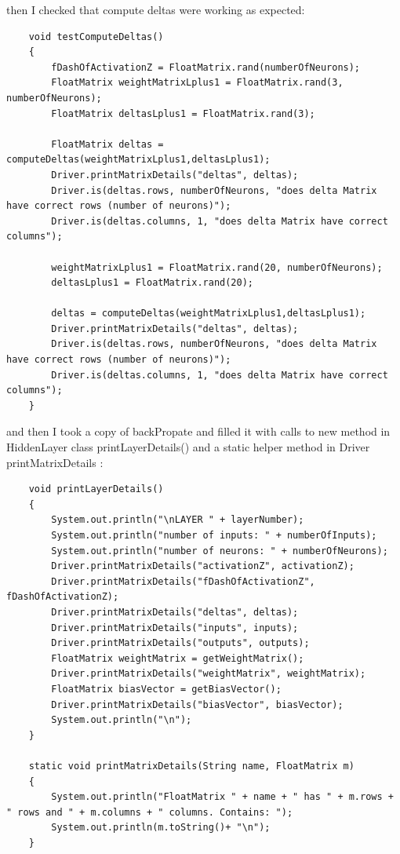 \documentclass[11pt]{article} %
\begin{document}
then I checked that compute deltas were working as expected:
\begin{lstlisting}
    void testComputeDeltas()
    {
        fDashOfActivationZ = FloatMatrix.rand(numberOfNeurons);
        FloatMatrix weightMatrixLplus1 = FloatMatrix.rand(3, numberOfNeurons);
        FloatMatrix deltasLplus1 = FloatMatrix.rand(3);

        FloatMatrix deltas = computeDeltas(weightMatrixLplus1,deltasLplus1);
        Driver.printMatrixDetails("deltas", deltas);
        Driver.is(deltas.rows, numberOfNeurons, "does delta Matrix have correct rows (number of neurons)");
        Driver.is(deltas.columns, 1, "does delta Matrix have correct columns");
        
        weightMatrixLplus1 = FloatMatrix.rand(20, numberOfNeurons);
        deltasLplus1 = FloatMatrix.rand(20);

        deltas = computeDeltas(weightMatrixLplus1,deltasLplus1);
        Driver.printMatrixDetails("deltas", deltas);
        Driver.is(deltas.rows, numberOfNeurons, "does delta Matrix have correct rows (number of neurons)");
        Driver.is(deltas.columns, 1, "does delta Matrix have correct columns");
    }
\end{lstlisting}

and then I took a copy of backPropate and filled it with calls to new method in HiddenLayer class printLayerDetails() and a static helper method in Driver printMatrixDetails :
\begin{lstlisting}
    void printLayerDetails()
    {
        System.out.println("\nLAYER " + layerNumber);
        System.out.println("number of inputs: " + numberOfInputs);
        System.out.println("number of neurons: " + numberOfNeurons);
        Driver.printMatrixDetails("activationZ", activationZ);
        Driver.printMatrixDetails("fDashOfActivationZ", fDashOfActivationZ);
        Driver.printMatrixDetails("deltas", deltas);
        Driver.printMatrixDetails("inputs", inputs);
        Driver.printMatrixDetails("outputs", outputs);
        FloatMatrix weightMatrix = getWeightMatrix();
        Driver.printMatrixDetails("weightMatrix", weightMatrix);
        FloatMatrix biasVector = getBiasVector();
        Driver.printMatrixDetails("biasVector", biasVector);
        System.out.println("\n");
    }

    static void printMatrixDetails(String name, FloatMatrix m)
    {
        System.out.println("FloatMatrix " + name + " has " + m.rows + " rows and " + m.columns + " columns. Contains: ");
        System.out.println(m.toString()+ "\n");
    }
\end{lstlisting}
\end{document}
